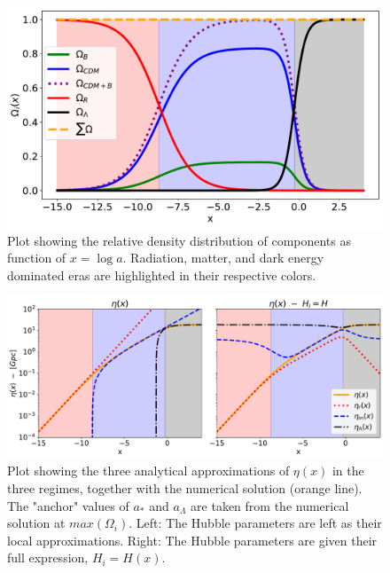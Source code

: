 \documentclass[10pt, a4paper]{article}
\begin{document}
\begin{figure}[H]
    \centering
    \includegraphics[scale=0.5]{../m1_figs/Omegas.pdf}
    \caption{Plot showing the relative density distribution of components as function of $x=\log{a}$. Radiation, matter, and dark energy dominated eras are highlighted in their respective colors.}
    \label{fig:Omegas}
\end{figure}


\begin{figure}[H]
    \centering
    \includegraphics[scale=0.5]{../m1_figs/Eta.pdf}
    \caption{Plot showing the three analytical approximations of $\eta(x)$ in the three regimes, together with the numerical solution (orange line). The "anchor" values of $a_*$ and $a_\Lambda$ are taken from the numerical solution at $max(\Omega_i)$. Left: The Hubble parameters are left as their local approximations. Right: The Hubble parameters are given their full expression, $H_i = H(x)$.}
    \label{fig:Eta}
\end{figure}
\end{document}
